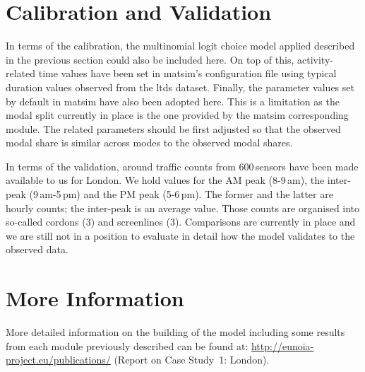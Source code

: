 \section{Calibration and Validation}
In terms of the calibration, the multinomial logit choice model applied described in the previous section could also be included here. On top of this, activity-related time values have been set in \gls{matsim}’s configuration file using typical duration values observed from the \gls{ltds} dataset. 
Finally, the parameter values set by default in \gls{matsim} 
have also been adopted here. This is a limitation as the modal split currently in place is the one provided by the \gls{matsim} corresponding module. 
The related parameters should be first adjusted so that the observed modal share is similar across modes to the observed modal shares.

In terms of the validation, around traffic counts from 600\,sensors have been made available to us for London. We hold values for the AM peak (8-9\,am), the inter-peak (9\,am-5\,pm) and the PM peak (5-6\,pm). The former and the latter are hourly counts; the inter-peak is an average value. 
Those counts are organised into so-called cordons (3) and screenlines (3). Comparisons are currently in place and we are still not in a position to evaluate in detail how the model validates to the observed data.

\section{More Information}
More detailed information on the building of the model including some results from each module previously 
described can be found at: \url{http://eunoia-project.eu/publications/} (Report on Case Study~1: London).

